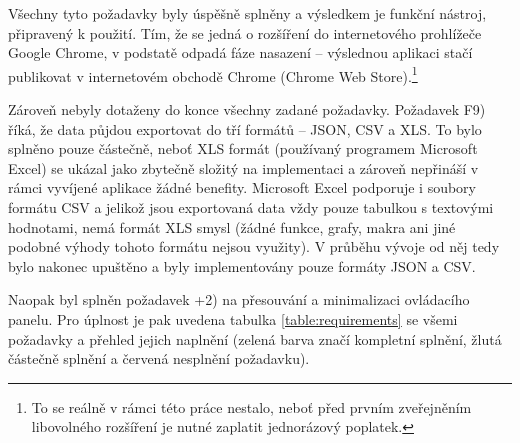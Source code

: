 \documentclass[thesis=B,czech]{FITthesis}[2012/06/26]
\begin{document}
Všechny tyto požadavky byly úspěšně splněny a výsledkem je funkční nástroj, připravený k použití. Tím, že se jedná o rozšíření do internetového prohlížeče Google Chrome, v podstatě odpadá fáze nasazení -- výslednou aplikaci stačí publikovat v internetovém obchodě Chrome (Chrome Web Store).\footnote{To se reálně v rámci této práce nestalo, neboť před prvním zveřejněním libovolného rozšíření je nutné zaplatit jednorázový poplatek.}

Zároveň nebyly dotaženy do konce všechny zadané požadavky. Požadavek F9) říká, že data půjdou exportovat do tří formátů -- JSON, CSV a XLS. To bylo splněno pouze částečně, neboť XLS formát (používaný programem Microsoft Excel) se ukázal jako zbytečně složitý na implementaci a zároveň nepřináší v rámci vyvíjené aplikace žádné benefity. Microsoft Excel podporuje i soubory formátu CSV a jelikož jsou exportovaná data vždy pouze tabulkou s textovými hodnotami, nemá formát XLS smysl (žádné funkce, grafy, makra ani jiné podobné výhody tohoto formátu nejsou využity). V průběhu vývoje od něj tedy bylo nakonec upuštěno a byly implementovány pouze formáty JSON a CSV.

Naopak byl splněn požadavek +2) na přesouvání a minimalizaci ovládacího panelu. Pro úplnost je pak uvedena tabulka \ref{table:requirements} se všemi požadavky a přehled jejich naplnění (zelená barva značí kompletní splnění, žlutá částečně splnění a červená nesplnění požadavku).
\end{document}

